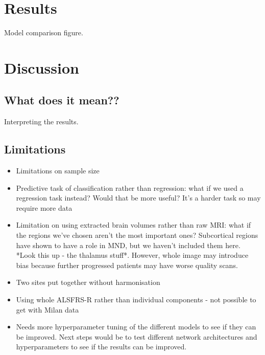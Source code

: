 \section{Results}
Model comparison figure.

\section{Discussion}
\subsection{What does it mean??}
Interpreting the results.

\subsection{Limitations}
\begin{itemize}
    \item Limitations on sample size
    \item Predictive task of classification rather than regression: what if we used a regression task instead? Would that be more useful? It's a harder task so may require more data
    \item Limitation on using extracted brain volumes rather than raw MRI: what if the regions we've chosen aren't the most important ones? Subcortical regions have shown to have a role in MND, but we haven't included them here. *Look this up - the thalamus stuff*. However, whole image may introduce bias because further progressed patients may have worse quality scans.
    \item Two sites put together without harmonisation
    \item Using whole ALSFRS-R rather than individual components - not possible to get with Milan data
    \item Needs more hyperparameter tuning of the different models to see if they can be improved. Next steps would be to test different network architectures and hyperparameters to see if the results can be improved.
\end{itemize}

